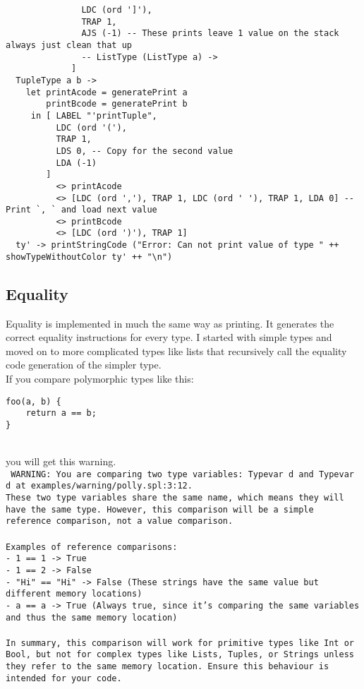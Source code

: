 \documentclass{report}
\begin{document}
\begin{verbatim}
               LDC (ord ']'),
               TRAP 1,
               AJS (-1) -- These prints leave 1 value on the stack always just clean that up
               -- ListType (ListType a) ->
             ]
  TupleType a b ->
    let printAcode = generatePrint a
        printBcode = generatePrint b
     in [ LABEL "'printTuple",
          LDC (ord '('),
          TRAP 1,
          LDS 0, -- Copy for the second value
          LDA (-1)
        ]
          <> printAcode
          <> [LDC (ord ','), TRAP 1, LDC (ord ' '), TRAP 1, LDA 0] -- Print `, ` and load next value
          <> printBcode
          <> [LDC (ord ')'), TRAP 1]
  ty' -> printStringCode ("Error: Can not print value of type " ++ showTypeWithoutColor ty' ++ "\n")
\end{verbatim}


\subsection{Equality}

Equality is implemented in much the same way as printing. It generates the correct equality instructions for every type. I started with simple types and moved on to more complicated types like lists that recursively call the equality code generation of the simpler type.
\\
If you compare polymorphic types like this:

\begin{lstlisting}[style=SPL]
foo(a, b) {
    return a == b;
}
\end{lstlisting}

\\you will get this warning.\\

\noindent\texttt{
\textcolor{warning}{WARNING}: You are comparing two type variables: \textcolor{type}{Typevar d} and \textcolor{type}{Typevar d} at \textcolor{filename}{examples/warning/polly.spl:3:12.}\\
These two type variables share the same name, which means they will have the same type. However, this comparison will be a simple reference comparison, not a value comparison. \\
\\
Examples of reference comparisons:\\
- 1 == 1 -> True\\
- 1 == 2 -> False\\
- "Hi" == "Hi" -> False (These strings have the same value but different memory locations)\\
- a == a -> True (Always true, since it's comparing the same variables and thus the same memory location)\\\\
In summary, this comparison will work for primitive types like Int or Bool, but not for complex types like Lists, Tuples, or Strings unless they refer to the same memory location. 
Ensure this behaviour is intended for your code.}
\end{document}

